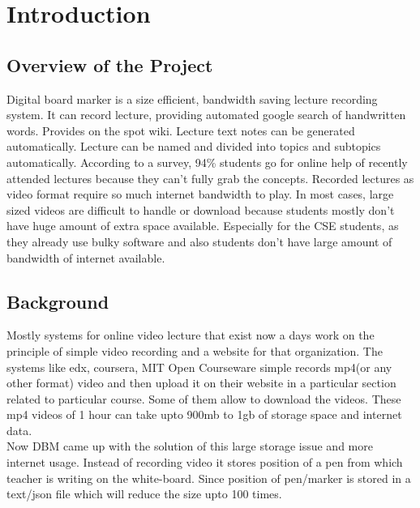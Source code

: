 
\chapter{Introduction} %
\label{Chapter1}
\section{Overview of the Project}
Digital board marker is a size efficient, bandwidth saving lecture recording system. It can record lecture, providing automated google search of handwritten words. Provides on the spot wiki. Lecture text notes can be generated automatically. Lecture can be named and divided into topics and subtopics automatically. According to a survey, 94\% students go for online help of recently attended lectures because they can't fully grab the concepts. Recorded lectures as video format require so much internet bandwidth to play. In most cases, large sized videos are difficult to handle or download because students mostly don't have huge amount of extra space available. Especially for the CSE students, as they already use bulky software and also students don't have large amount of bandwidth of internet available.
\bigskip

\section{Background}
Mostly systems for online video lecture that exist now a days work on the principle of simple video recording and a website for that organization. The systems like edx, coursera, MIT Open Courseware simple records mp4(or any other format) video and then upload it on their website in a particular section related to particular course. Some of them allow to download the videos. These mp4 videos of 1 hour can take upto 900mb to 1gb of storage space and internet data.\\
Now DBM came up with the solution of this large storage issue and more internet usage. Instead of recording video it stores position of a pen from which teacher is writing on the white-board. Since position of pen/marker is stored in a text/json file which will reduce the size upto 100 times. 

\bigskip

